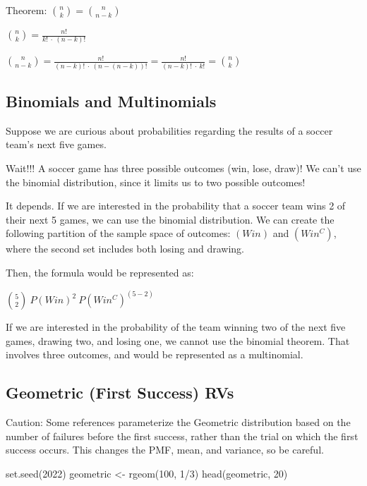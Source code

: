 \documentclass[
]{book}
\newenvironment{Shaded}{\begin{snugshade}}{\end{snugshade}}
\newcommand{\DecValTok}[1]{\textcolor[rgb]{0.00,0.00,0.81}{#1}}
\newcommand{\FunctionTok}[1]{\textcolor[rgb]{0.00,0.00,0.00}{#1}}
\newcommand{\NormalTok}[1]{#1}
\newcommand{\OtherTok}[1]{\textcolor[rgb]{0.56,0.35,0.01}{#1}}
\newcommand{\SpecialCharTok}[1]{\textcolor[rgb]{0.00,0.00,0.00}{#1}}
\theoremstyle{definition}
\theoremstyle{definition}
\theoremstyle{definition}
\theoremstyle{definition}
\theoremstyle{remark}
\begin{document}
Theorem: \(\binom{n}{k} = \binom{n}{n-k}\)

\(\binom{n}{k} = \frac{n!}{k!\ \cdot\ (n-k)!}\)

\(\binom{n}{n-k} = \frac{n!}{(n-k)!\ \cdot\ (n-(n-k))!} = \frac{n!}{(n-k)!\ \cdot\ k!} = \binom{n}{k}\)

\hypertarget{binomials-and-multinomials-1}{%
\subsection{Binomials and Multinomials}\label{binomials-and-multinomials-1}}

Suppose we are curious about probabilities regarding the results of a soccer team's next five games.

Wait!!! A soccer game has three possible outcomes (win, lose, draw)! We can't use the binomial distribution, since it limits us to two possible outcomes!

It depends. If we are interested in the probability that a soccer team wins 2 of their next 5 games, we can use the binomial distribution. We can create the following partition of the sample space of outcomes: \((Win)\) and \((Win^C)\), where the second set includes both losing and drawing.

Then, the formula would be represented as:

\(\binom{5}{2}\ P(Win)^2\  P(Win^C)^{(5-2)}\)

If we are interested in the probability of the team winning two of the next five games, drawing two, and losing one, we cannot use the binomial theorem. That involves three outcomes, and would be represented as a multinomial.

\hypertarget{geometric-first-success-rvs-1}{%
\subsection{Geometric (First Success) RVs}\label{geometric-first-success-rvs-1}}

Caution: Some references parameterize the Geometric distribution based on the number of failures before the first success, rather than the trial on which the first success occurs. This changes the PMF, mean, and variance, so be careful.

\begin{Shaded}
\begin{Highlighting}[]
\FunctionTok{set.seed}\NormalTok{(}\DecValTok{2022}\NormalTok{)}
\NormalTok{geometric }\OtherTok{\textless{}{-}} \FunctionTok{rgeom}\NormalTok{(}\DecValTok{100}\NormalTok{, }\DecValTok{1}\SpecialCharTok{/}\DecValTok{3}\NormalTok{)}
\FunctionTok{head}\NormalTok{(geometric, }\DecValTok{20}\NormalTok{)}
\end{Highlighting}
\end{Shaded}
\end{document}
